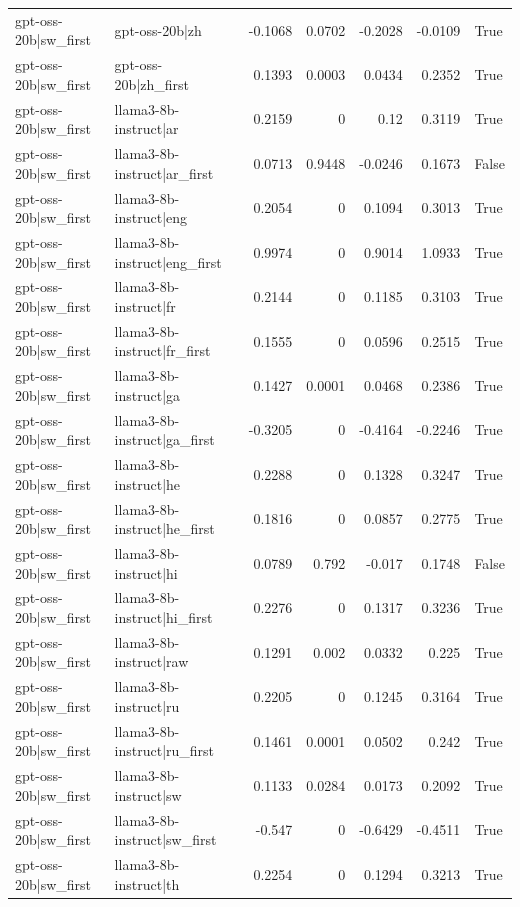 \begin{table}
\begin{tabular}{l l r r r r l}
gpt-oss-20b|sw_first & gpt-oss-20b|zh & -0.1068 & 0.0702 & -0.2028 & -0.0109 & True \\
gpt-oss-20b|sw_first & gpt-oss-20b|zh_first & 0.1393 & 0.0003 & 0.0434 & 0.2352 & True \\
gpt-oss-20b|sw_first & llama3-8b-instruct|ar & 0.2159 & 0 & 0.12 & 0.3119 & True \\
gpt-oss-20b|sw_first & llama3-8b-instruct|ar_first & 0.0713 & 0.9448 & -0.0246 & 0.1673 & False \\
gpt-oss-20b|sw_first & llama3-8b-instruct|eng & 0.2054 & 0 & 0.1094 & 0.3013 & True \\
gpt-oss-20b|sw_first & llama3-8b-instruct|eng_first & 0.9974 & 0 & 0.9014 & 1.0933 & True \\
gpt-oss-20b|sw_first & llama3-8b-instruct|fr & 0.2144 & 0 & 0.1185 & 0.3103 & True \\
gpt-oss-20b|sw_first & llama3-8b-instruct|fr_first & 0.1555 & 0 & 0.0596 & 0.2515 & True \\
gpt-oss-20b|sw_first & llama3-8b-instruct|ga & 0.1427 & 0.0001 & 0.0468 & 0.2386 & True \\
gpt-oss-20b|sw_first & llama3-8b-instruct|ga_first & -0.3205 & 0 & -0.4164 & -0.2246 & True \\
gpt-oss-20b|sw_first & llama3-8b-instruct|he & 0.2288 & 0 & 0.1328 & 0.3247 & True \\
gpt-oss-20b|sw_first & llama3-8b-instruct|he_first & 0.1816 & 0 & 0.0857 & 0.2775 & True \\
gpt-oss-20b|sw_first & llama3-8b-instruct|hi & 0.0789 & 0.792 & -0.017 & 0.1748 & False \\
gpt-oss-20b|sw_first & llama3-8b-instruct|hi_first & 0.2276 & 0 & 0.1317 & 0.3236 & True \\
gpt-oss-20b|sw_first & llama3-8b-instruct|raw & 0.1291 & 0.002 & 0.0332 & 0.225 & True \\
gpt-oss-20b|sw_first & llama3-8b-instruct|ru & 0.2205 & 0 & 0.1245 & 0.3164 & True \\
gpt-oss-20b|sw_first & llama3-8b-instruct|ru_first & 0.1461 & 0.0001 & 0.0502 & 0.242 & True \\
gpt-oss-20b|sw_first & llama3-8b-instruct|sw & 0.1133 & 0.0284 & 0.0173 & 0.2092 & True \\
gpt-oss-20b|sw_first & llama3-8b-instruct|sw_first & -0.547 & 0 & -0.6429 & -0.4511 & True \\
gpt-oss-20b|sw_first & llama3-8b-instruct|th & 0.2254 & 0 & 0.1294 & 0.3213 & True \\

\end{tabular}
\end{table}
